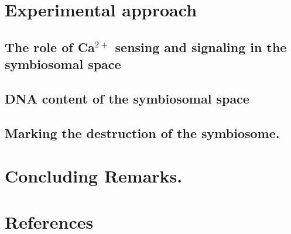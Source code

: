 \section*{Experimental approach}
\subsection*{The role of Ca$^{2+}$ sensing and signaling in the symbiosomal space}
\subsection*{DNA content of the symbiosomal space}
\subsection*{Marking the destruction of the symbiosome.}

	\section*{Concluding Remarks.}
\section*{References}



